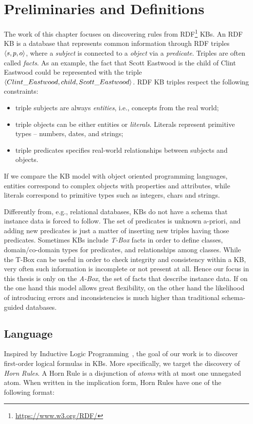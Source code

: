 \section{Preliminaries and Definitions} \label{sec:krd_prel}
The work of this chapter focuses on discovering rules from RDF\footnote{\url{https://www.w3.org/RDF/}} KBs. An RDF KB is
a database that represents common information through RDF triples $\langle s,p,o\rangle$, where a \emph{subject} is connected to a \emph{object} via a \emph{predicate}. Triples are often called \emph{facts}. As an example, the fact that Scott Eastwood is the child of Clint Eastwood could be represented with the triple $\langle Clint\_Eastwood,child,Scott\_Eastwood\rangle$. 
RDF KB triples respect the following constraints:
\begin{itemize}
	\item triple subjects are always \emph{entities}, i.e., concepts from the real world;
	\item triple objects can be either entities or \emph{literals}. Literals represent primitive types -- numbers, dates, and strings;
	\item triple predicates specifies real-world relationships between subjects and objects.
\end{itemize} 
If we compare the KB model with object oriented programming languages, entities correspond to complex objects with properties and attributes, while literals correspond to primitive types such as integers, chars and strings.

Differently from, e.g., relational databases, KBs do not have a schema that instance data is forced to follow. The set of predicates is unknown a-priori, and adding new predicates is just a matter of inserting new triples having those predicates. Sometimes KBs include \emph{T-Box} facts in order to define classes, domain/co-domain types for predicates, and relationships among classes.
While the T-Box can be useful in order to check integrity and consistency within a KB, very often such information is incomplete or not present at all. Hence our focus in this thesis is only on the \emph{A-Box}, the set of facts that describe instance data. If on the one hand this model allows great flexibility, on the other hand the likelihood of introducing errors and inconsistencies is much higher than traditional schema-guided databases.

\subsection{Language} \label{sec:krd_language} 
Inspired by Inductive Logic Programming~\cite{muggleton1994inductive}, the goal of our work is to discover first-order logical formulas in KBs. More specifically, we target the discovery of \emph{Horn Rules}. A Horn Rule is a disjunction of \emph{atoms} with at most one unnegated atom. When written in the implication form, Horn Rules have one of the following format:

